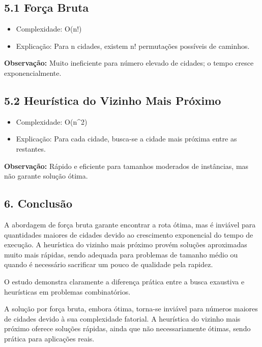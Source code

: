 \documentclass[
]{article}
\providecommand{\tightlist}{%
  \setlength{\itemsep}{0pt}\setlength{\parskip}{0pt}}
\begin{document}
\hypertarget{foruxe7a-bruta}{%
\subsection{5.1 Força Bruta}\label{foruxe7a-bruta}}

\begin{itemize}
\tightlist
\item
  Complexidade: O(n!)
\item
  Explicação: Para n cidades, existem n! permutações possíveis de
  caminhos.
\end{itemize}

\textbf{Observação:} Muito ineficiente para número elevado de cidades; o
tempo cresce exponencialmente.

\hypertarget{heuruxedstica-do-vizinho-mais-pruxf3ximo}{%
\subsection{5.2 Heurística do Vizinho Mais
Próximo}\label{heuruxedstica-do-vizinho-mais-pruxf3ximo}}

\begin{itemize}
\tightlist
\item
  Complexidade: O(n\^{}2)
\item
  Explicação: Para cada cidade, busca-se a cidade mais próxima entre as
  restantes.
\end{itemize}

\textbf{Observação:} Rápido e eficiente para tamanhos moderados de
instâncias, mas não garante solução ótima.

\hypertarget{conclusuxe3o}{%
\subsection{6. Conclusão}\label{conclusuxe3o}}

A abordagem de força bruta garante encontrar a rota ótima, mas é
inviável para quantidades maiores de cidades devido ao crescimento
exponencial do tempo de execução. A heurística do vizinho mais próximo
provém soluções aproximadas muito mais rápidas, sendo adequada para
problemas de tamanho médio ou quando é necessário sacrificar um pouco de
qualidade pela rapidez.

O estudo demonstra claramente a diferença prática entre a busca
exaustiva e heurísticas em problemas combinatórios.

A solução por força bruta, embora ótima, torna-se inviável para números
maiores de cidades devido à sua complexidade fatorial. A heurística do
vizinho mais próximo oferece soluções rápidas, ainda que não
necessariamente ótimas, sendo prática para aplicações reais.
\end{document}

